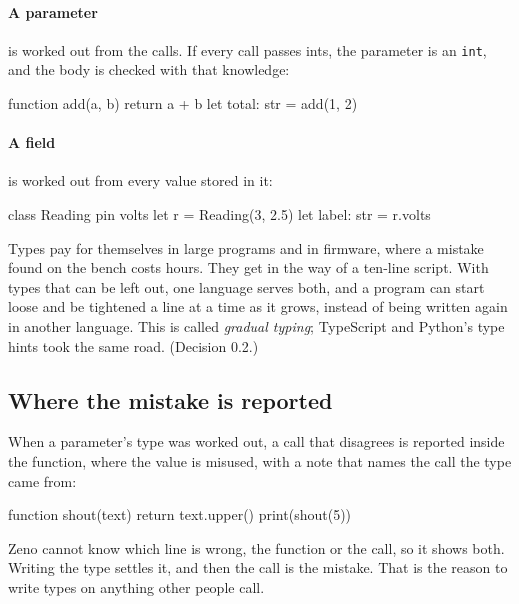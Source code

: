 \paragraph{A parameter} is worked out from the calls. If every call
passes ints, the parameter is an \verb|int|, and the body is checked
with that knowledge:

\begin{zeno}[fails=yes]
function add(a, b) {
    return a + b
}
let total: str = add(1, 2)
\end{zeno}

\paragraph{A field} is worked out from every value stored in it:

\begin{zeno}[fails=yes]
class Reading {
    pin
    volts
}
let r = Reading(3, 2.5)
let label: str = r.volts
\end{zeno}

\begin{why}
Types pay for themselves in large programs and in firmware, where a
mistake found on the bench costs hours. They get in the way of a
ten-line script. With types that can be left out, one language serves
both, and a program can start loose and be tightened a line at a time
as it grows, instead of being written again in another language.
This is called \emph{gradual typing}; TypeScript and Python's type
hints took the same road. (Decision 0.2.)
\end{why}

\subsection{Where the mistake is reported}

When a parameter's type was worked out, a call that disagrees is
reported inside the function, where the value is misused, with a note
that names the call the type came from:

\begin{zeno}[fails=yes]
function shout(text) {
    return text.upper()
}
print(shout(5))
\end{zeno}

Zeno cannot know which line is wrong, the function or the call, so it
shows both. Writing the type settles it, and then the call is the
mistake. That is the reason to write types on anything other people
call.

